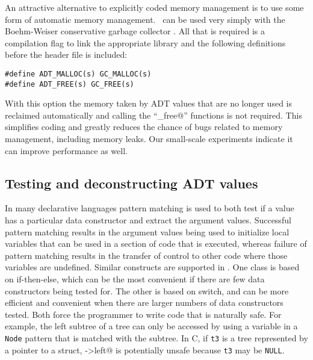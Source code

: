 An attractive alternative to explicitly coded memory management is to
use some form of automatic memory management.  \Adtpp\ can be used very
simply with the Boehm-Weiser conservative garbage collector \cite{boehm}.
All that is required is a compilation flag to link the appropriate library
and the following definitions before the header file is included:
\begin{verbatim}
#define ADT_MALLOC(s) GC_MALLOC(s)
#define ADT_FREE(s) GC_FREE(s)
\end{verbatim}
With this option the memory taken by ADT values that are no longer
used is reclaimed automatically and calling the ``\verb@_free@''
functions is not required.  This simplifies coding and greatly reduces
the chance of bugs related to memory management, including memory leaks.
Our small-scale experiments indicate it can improve performance as well.

\subsection{Testing and deconstructing ADT values}

In many declarative languages pattern matching is used to both test if a
value has a particular data constructor and extract the argument values.
Successful pattern matching results in the argument values being used
to initialize local variables that can be used in a section of code
that is executed, whereas failure of pattern matching results in the
transfer of control to other code where those variables are undefined.
Similar constructs are supported in \adtpp.  One class is based on
if-then-else, which can be the most convenient if there are few data
constructors being tested for.  The other is based on switch, and can be
more efficient and convenient when there are larger
numbers of data constructors tested.  Both force the programmer to write
code that is naturally safe.  For example, 
the left subtree of a tree can only be accessed by using a variable
in a \texttt{Node} pattern that is matched with the subtree.  In C, if
\texttt{t3} is a tree represented by a pointer to a struct,
->left@ is potentially unsafe because \texttt{t3} may be
\texttt{NULL}.

